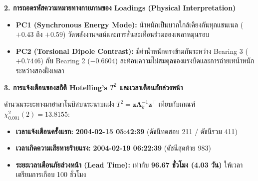 \documentclass[12pt,a4paper]{article}
\begin{document}
\begin{ansbox}[unbreakable, fontupper={\fontsize{9.6pt}{12.6pt}\selectfont}, left=6pt, right=6pt, top=3pt, bottom=3pt]
\vspace{0.15em}
\noindent\textbf{\normalsize 2. การถอดรหัสความหมายทางกายภาพของ Loadings (Physical Interpretation)}\par\vspace{0.05em}
\begin{center}
\footnotesize
\setlength{\tabcolsep}{4pt}
\renewcommand{\arraystretch}{0.9}
\end{center}
\vspace{-0.3em}
\begin{itemize}[leftmargin=1.2em, itemsep=0.5pt, topsep=0.5pt]
    \item \textbf{PC1 (Synchronous Energy Mode):} น้ำหนักเป็นบวกใกล้เคียงกันทุกแชนเนล ($+0.43$ ถึง $+0.59$) วัดพลังงานจลน์และการสั่นสะเทือนร่วมของเพลาหมุนรอบ
    \item \textbf{PC2 (Torsional Dipole Contrast):} มีค่าน้ำหนักตรงข้ามกันระหว่าง Bearing 3 ($+0.7446$) กับ Bearing 2 ($-0.6604$) สะท้อนความไม่สมดุลของแรงบิดและการถ่ายเทน้ำหนักระหว่างสองฝั่งเพลา
\end{itemize}

\vspace{0.15em}
\noindent\textbf{\normalsize 3. การแจ้งเตือนของสถิติ Hotelling's $T^2$ และเวลาเตือนภัยล่วงหน้า}\par\vspace{0.05em}
คำนวณระยะทางมาฮาลาโนบิสบนระนาบแฝง $T^2 = \mathbf{z} \mathbf{\Lambda}_k^{-1} \mathbf{z}^\top$ เทียบกับเกณฑ์ $\chi^2_{0.001}(2) = 13.8155$:
\begin{itemize}[leftmargin=1.2em, itemsep=0.5pt, topsep=0.5pt]
    \item \textbf{เวลาแจ้งเตือนครั้งแรก:} \textbf{2004-02-15 05:42:39} (ดัชนีทดสอบ 211 / ดัชนีรวม 411)
    \item \textbf{เวลาเกิดความเสียหายร้ายแรง:} \textbf{2004-02-19 06:22:39} (ดัชนีสุดท้าย 983)
    \item \textbf{ระยะเวลาเตือนภัยล่วงหน้า (Lead Time):} เท่ากับ \textbf{96.67 ชั่วโมง (4.03 วัน)} ให้เวลาเตรียมการเกือบ 100 ชั่วโมง
\end{itemize}
\end{ansbox}
\end{document}
